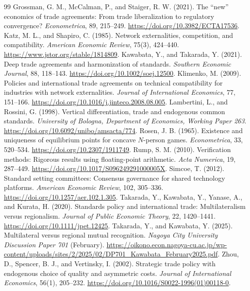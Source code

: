 \documentclass[11pt,a4paper]{article}
\theoremstyle{remark}\newtheorem{remark}[theorem]{Remark}
\begin{document}
\begin{thebibliography}{99}
 Grossman, G. M., McCalman, P., and Staiger, R. W. (2021). The ``new'' economics of trade agreements: From trade liberalization to regulatory convergence? \emph{Econometrica}, 89, 215--249. \url{https://doi.org/10.3982/ECTA17536}.
 Katz, M. L., and Shapiro, C. (1985). Network externalities, competition, and compatibility. \emph{American Economic Review}, 75(3), 424--440. \url{https://www.jstor.org/stable/1814809}.
 Kawabata, Y., and Takarada, Y. (2021). Deep trade agreements and harmonization of standards. \emph{Southern Economic Journal}, 88, 118--143. \url{https://doi.org/10.1002/soej.12500}.
 Klimenko, M. (2009). Policies and international trade agreements on technical compatibility for industries with network externalities. \emph{Journal of International Economics}, 77, 151--166. \url{https://doi.org/10.1016/j.jinteco.2008.08.005}.
 Lambertini, L., and Rossini, G. (1998). Vertical differentiation, trade and endogenous common standards. \emph{University of Bologna, Department of Economics, Working Paper 263}. \url{https://doi.org/10.6092/unibo/amsacta/774}.
 Rosen, J. B. (1965). Existence and uniqueness of equilibrium points for concave $N$-person games. \emph{Econometrica}, 33, 520--534. \url{https://doi.org/10.2307/1911749}.
 Rump, S. M. (2010). Verification methods: Rigorous results using floating-point arithmetic. \emph{Acta Numerica}, 19, 287--449. \url{https://doi.org/10.1017/S096249291000005X}.
 Simcoe, T. (2012). Standard setting committees: Consensus governance for shared technology platforms. \emph{American Economic Review}, 102, 305--336. \url{https://doi.org/10.1257/aer.102.1.305}.
 Takarada, Y., Kawabata, Y., Yanase, A., and Kurata, H. (2020). Standards policy and international trade: Multilateralism versus regionalism. \emph{Journal of Public Economic Theory}, 22, 1420--1441. \url{https://doi.org/10.1111/jpet.12425}.
 Takarada, Y., and Kawabata, Y. (2025). Multilateral versus regional mutual recognition. \emph{Nagoya City University Discussion Paper 701} (February). \url{https://oikono.econ.nagoya-cu.ac.jp/wp-content/uploads/sites/2/2025/02/DP701_Kawabata_February2025.pdf}.
 Zhou, D., Spencer, B. J., and Vertinsky, I. (2002). Strategic trade policy with endogenous choice of quality and asymmetric costs. \emph{Journal of International Economics}, 56(1), 205--232. \url{https://doi.org/10.1016/S0022-1996(01)00118-0}.
\end{thebibliography}
\end{document}
